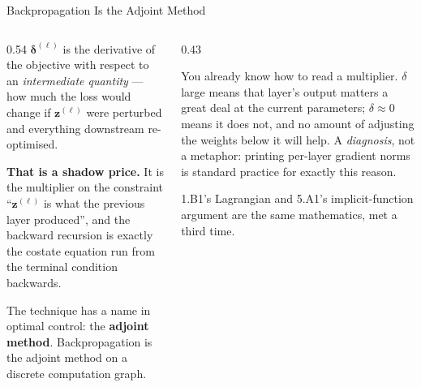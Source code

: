 \begin{frame}{Backpropagation Is the Adjoint Method}
\begin{columns}[T]
\begin{column}{0.54\textwidth}
\small
$\boldsymbol\delta^{(\ell)}$ is the derivative of the objective with respect to an \emph{intermediate quantity} --- how much the loss would change if $\mathbf{z}^{(\ell)}$ were perturbed and everything downstream re-optimised.
\medskip

\textbf{That is a shadow price.} It is the multiplier on the constraint ``$\mathbf{z}^{(\ell)}$ is what the previous layer produced'', and the backward recursion is exactly the costate equation run from the terminal condition backwards.
\medskip

The technique has a name in optimal control: the \textbf{adjoint method}. Backpropagation is the adjoint method on a discrete computation graph.
\end{column}
\begin{column}{0.43\textwidth}
\begin{conceptbox}[title=\textbf{Why this is worth a slide}]\small
You already know how to read a multiplier. $\delta$ large means that layer's output matters a great deal at the current parameters; $\delta\approx0$ means it does not, and no amount of adjusting the weights below it will help.
\medskip
A \emph{diagnosis}, not a metaphor: printing per-layer gradient norms is standard practice for exactly this reason.
\end{conceptbox}
\smallskip
\begin{examplebox}\footnotesize
1.B1's Lagrangian and 5.A1's implicit-function argument are the same mathematics, met a third time.
\end{examplebox}
\end{column}
\end{columns}
\vspace{1mm}
\end{frame}

